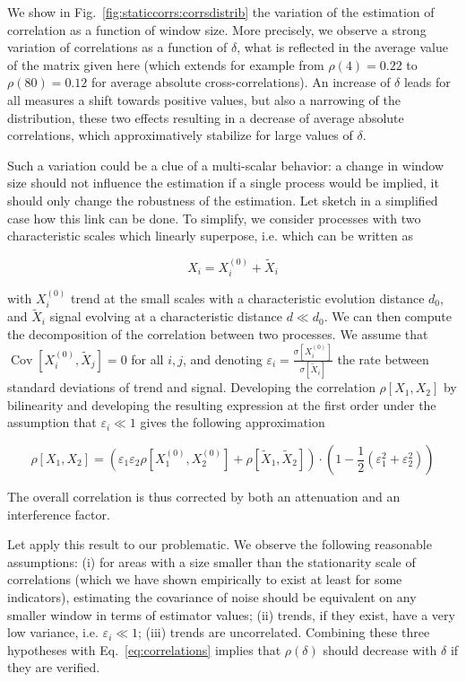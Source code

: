 \documentclass[11pt]{article}
\DeclareMathOperator{\Cov}{Cov}
\newcommand{\Covb}[2]{\ensuremath{\Cov\!\left[#1,#2\right]}}
\begin{document}
We show in Fig.~\ref{fig:staticcorrs:corrsdistrib} the variation of the estimation of correlation as a function of window size. More precisely, we observe a strong variation of correlations as a function of $\delta$, what is reflected in the average value of the matrix given here (which extends for example from $\rho(4)=0.22$ to $\rho(80)=0.12$ for average absolute cross-correlations). An increase of $\delta$ leads for all measures a shift towards positive values, but also a narrowing of the distribution, these two effects resulting in a decrease of average absolute correlations, which approximatively stabilize for large values of $\delta$.

Such a variation could be a clue of a multi-scalar behavior: a change in window size should not influence the estimation if a single process would be implied, it should only change the robustness of the estimation. Let sketch in a simplified case how this link can be done. To simplify, we consider processes with two characteristic scales which linearly superpose, i.e. which can be written as

\begin{equation}
X_i = X_i^{(0)} + \tilde{X}_i
\end{equation}

with $X_i^{(0)}$ trend at the small scales with a characteristic evolution distance $d_0$, and $\tilde{X}_i$ signal evolving at a characteristic distance $d \ll d_0$. We can then compute the decomposition of the correlation between two processes. We assume that $\Covb{X_i^{(0)}}{\tilde{X}_j} = 0$ for all $i,j$, and denoting $\varepsilon_i = \frac{\sigma\left[X_i^{(0)}\right]}{\sigma\left[\tilde{X}_i\right]}$ the rate between standard deviations of trend and signal. Developing the correlation $\rho\left[X_1,X_2\right]$ by bilinearity and developing the resulting expression at the first order under the assumption that $\varepsilon_i \ll 1$ gives the following approximation


\begin{equation}
	\rho\left[X_1,X_2\right] = \left( \varepsilon_1 \varepsilon_2\rho\left[X_1^{(0)},X_2^{(0)}\right] + \rho\left[\tilde{X}_1,\tilde{X}_2\right]\right)\cdot\left(1 - \frac{1}{2}(\varepsilon_1^2 + \varepsilon_2^2)\right)
	\label{eq:correlations}
\end{equation}


The overall correlation is thus corrected by both an attenuation and an interference factor.


Let apply this result to our problematic. We observe the following reasonable assumptions: (i) for areas with a size smaller than the stationarity scale of correlations (which we have shown empirically to exist at least for some indicators), estimating the covariance of noise should be equivalent on any smaller window in terms of estimator values; (ii) trends, if they exist, have a very low variance, i.e. $\varepsilon_i \ll 1$; (iii) trends are uncorrelated. Combining these three hypotheses with Eq.~\ref{eq:correlations} implies that $\rho (\delta)$ should decrease with $\delta$ if they are verified.
\end{document}
